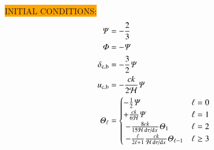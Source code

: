 \noindent\colorbox{orange}{INITIAL CONDITIONS:}
\begin{subequations}\label{mil3:theo:eq:initial_conditions}
\begin{align}
    \Psi     &= -\frac{2}{3}     \label{mil3:theo:eq:init_Psi}\\
    \Phi     &= -\Psi         \label{mil3:theo:eq:init_Phi}\\
    \delta\ped{c, b}&= -\frac{3}{2} \Psi     \label{mil3:theo:eq:init_delta}\\
    u\ped{c, b}     &= -\frac{ck}{2\Hp} \Psi \label{mil3:theo:eq:init_u}\\
    \Theta_\ell &=\begin{cases}
        -\frac{1}{2}\Psi     & \ell = 0  \\
        +\frac{ck}{6\Hp}\Psi  & \ell = 1 \\ 
        -\frac{8ck}{15\Hp\dv*{\tau}{x}}\Theta_1    & \ell = 2 \\ 
        -\frac{\ell}{2\ell+1} \frac{ck}{\Hp\dv*{\tau}{x}} \Theta_{\ell-1} &\ell \geq 3
    \end{cases} \label{mil3:theo:eq:init_Theta}
\end{align}
\end{subequations}

\sendhelp
